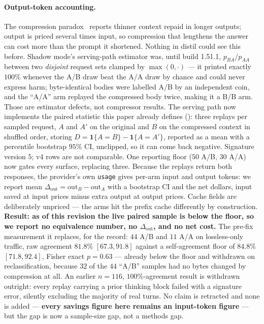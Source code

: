 \documentclass{article}
\begin{document}
\paragraph{Output-token accounting.} The compression paradox~\cite{compressionparadox}
reports thinner context repaid in longer outputs; output is priced several times input, so
compression that lengthens the answer can cost more than the prompt it shortened. Nothing in
distil could see this before. Shadow mode's serving-path estimator was, until build 1.51.1,
$p_{BA}/p_{AA}$ between two \emph{disjoint} request sets clamped by $\max(0,\cdot)$ --- it
printed exactly $100\%$ whenever the A/B draw beat the A/A draw by chance and could never
express harm; byte-identical bodies were labelled A/B by an independent coin, and the ``A/A''
arm replayed the compressed body twice, making it a B/B arm. Those are estimator defects, not
compressor results. The serving path now implements the paired statistic this paper already
defines (): three replays per sampled request, $A$ and $A'$ on the original
and $B$ on the compressed context in shuffled order, storing $D = \mathbf{1}\{A{=}B\} -
\mathbf{1}\{A{=}A'\}$, reported as a mean with a percentile bootstrap $95\%$ CI, unclipped, so
it can come back negative. Signature version $5$; v4 rows are not comparable. One reporting
floor ($50$ A/B, $30$ A/A) now gates every surface, replacing three. Because the replays
return both responses, the provider's own \texttt{usage} gives per-arm input and output
tokens: we report mean $\Delta_{\text{out}} = \text{out}_B - \text{out}_A$ with a bootstrap CI
and the net dollars, input saved at input prices minus extra output at output prices. Cache
fields are deliberately unpriced --- the arms hit the prefix cache differently by
construction. \textbf{Result: as of this revision the live paired sample is below the floor,
so we report no equivalence number, no $\Delta_{\text{out}}$, and no net cost.} The pre-fix
measurement it replaces, for the record: $44$ A/B and $11$ A/A on lossless-only traffic, raw
agreement $81.8\%$ $[67.3, 91.8]$ against a self-agreement floor of $84.8\%$ $[71.8, 92.4]$,
Fisher exact $p=0.63$ --- already below the floor and withdrawn on reclassification, because
$32$ of the $44$ ``A/B'' samples had no bytes changed by compression at all. An earlier
$n{=}116$, $100\%$-agreement result is withdrawn outright: every replay carrying a prior
thinking block failed with a signature error, silently excluding the majority of real turns.
No claim is retracted and none is added --- \textbf{every savings figure here remains an
input-token figure} --- but the gap is now a sample-size gap, not a methods gap.
\end{document}
